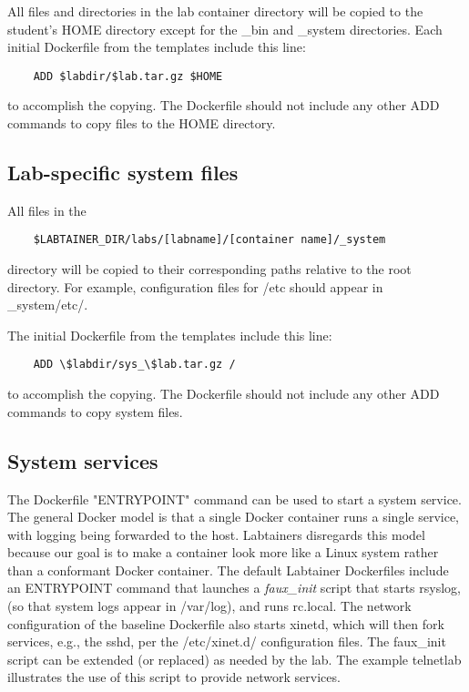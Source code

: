 \documentclass[12pt]{article}
\begin{document}
All files and directories in the lab container directory will be copied to the student's HOME
directory except for the \_bin and \_system directories.
Each initial Dockerfile from the templates include this line:
\begin{verbatim}
    ADD $labdir/$lab.tar.gz $HOME
\end{verbatim}
to accomplish the copying. The Dockerfile should not include any other ADD commands
to copy files to the HOME directory.

\subsection{Lab-specific system files}
All files in the
\begin{verbatim}
    $LABTAINER_DIR/labs/[labname]/[container name]/_system
\end{verbatim}
directory will be copied to their corresponding paths relative to the root directory.
For example, configuration files for /etc should appear in \_system/etc/.

The initial Dockerfile from the templates include this line:
\begin{verbatim}
    ADD \$labdir/sys_\$lab.tar.gz /
\end{verbatim}
to accomplish the copying. The Dockerfile should not include any other ADD commands
to copy system files.

\subsection {System services}
The Dockerfile "ENTRYPOINT" command can be used to start a system service.  The general Docker 
model is that a single Docker container runs a single service, with logging being forwarded to 
the host.  Labtainers disregards this model because our goal is to make a container look more like a Linux
system rather than a conformant Docker container.  The default Labtainer Dockerfiles include an
ENTRYPOINT command that launches a \textit{faux\_init} script that starts rsyslog, (so that system logs
appear in /var/log), and runs rc.local.  The network configuration of the baseline Dockerfile also starts xinetd,
which will then fork services, e.g., the sshd, per the /etc/xinet.d/ configuration files.  The faux\_init script
can be extended (or replaced) as needed by the lab.  The example telnetlab illustrates the use of this script
to provide network services.
\end{document}
